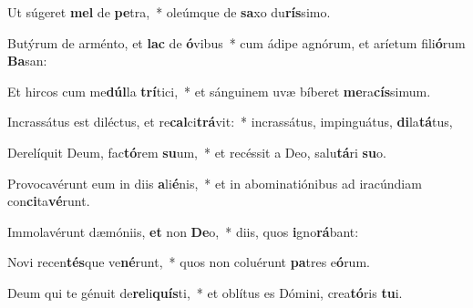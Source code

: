 \item Ut súgeret \textbf{mel} de \textbf{pe}tra,~* oleúmque de \textbf{sa}xo du\textbf{rís}simo.
\item Butýrum de arménto, et \textbf{lac} de \textbf{ó}vibus~* cum ádipe agnórum, et aríetum fili\textbf{ó}rum \textbf{Ba}san:
\item Et hircos cum me\textbf{dúl}la \textbf{trí}tici,~* et sánguinem uvæ bíberet \textbf{me}ra\textbf{cís}simum.
\item Incrassátus est diléctus, et re\textbf{cal}ci\textbf{trá}vit:~* incrassátus, impinguátus, \textbf{di}la\textbf{tá}tus,
\item Derelíquit Deum, fac\textbf{tó}rem \textbf{su}um,~* et recéssit a Deo, salu\textbf{tá}ri \textbf{su}o.
\item Provocavérunt eum in diis \textbf{a}li\textbf{é}nis,~* et in abominatiónibus ad iracúndiam con\textbf{ci}ta\textbf{vé}runt.
\item Immolavérunt dæmóniis, \textbf{et} non \textbf{De}o,~* diis, quos \textbf{i}gno\textbf{rá}bant:
\item Novi recen\textbf{tés}que ve\textbf{né}runt,~* quos non coluérunt \textbf{pa}tres e\textbf{ó}rum.
\item Deum qui te génuit de\textbf{re}li\textbf{quís}ti,~* et oblítus es Dómini, crea\textbf{tó}ris \textbf{tu}i.
